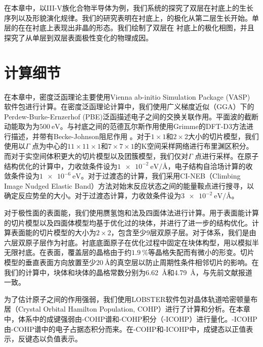 在本章中，以III-V族化合物半导体为例，我们系统的探究了双层在衬底上的生长序列以及形貌演化规律。我们的研究表明在衬底上，的极化从第二层生长开始。单层的在在衬底上表现出非晶的形态。我们绘制了双层在
衬底上的极化相图，并且探究了从单层到双层表面极性变化的物理成因。
\section{计算细节}
在本章中，密度泛函理论主要使用Vienna ab-initio Simulation Package (VASP) 软件包进行计算。在密度泛函理论计算中，我们使用广义梯度近似（GGA）下的Perdew-Burke-Ernzerhof (PBE)泛函描述电子之间的交换关联作用。平面波的截断动能取为为$\SI{500}{\electronvolt}$。与衬底之间的范德瓦尔斯作用使用Grimme的DFT-D3方法进行描述，并带有Becke-Johnson阻尼作用 。对于$1 \times 1$和$2 \times 2$大小的切片模型，我们使用以$\Gamma$ 点为中心的$11 \times 11 \times 1$和$7 \times 7 \times 1$的K空间采样网络进行布里渊区积分。而对于实空间体积更大的切片模型以及团簇模型，我们仅对$\Gamma$ 点进行采样。在原子结构优化的计算中，力收敛条件设为$\SI{1e-2}{\electronvolt \per \angstrom}$，电子结构自洽场计算的收敛条件设为$\SI{1e-6}{\electronvolt}$。对于过渡态的计算，我们采用CI-NEB（Climbing Image Nudged Elastic Band）方法对始末反应状态之间的能量鞍点进行搜寻，以确定反应势垒的大小。对于过渡态计算，力收敛条件设为$\SI{3e-2}{\electronvolt \per \angstrom}$。

对于极性面的表面能，我们使用赝氢饱和法及四面体法进行计算。用于表面能计算的切片模型以及四面体模型均基于优化过的块体，并进行了进一步的结构优化。计算表面能的切片模型的大小为$2 \times 2$，包含至少9层双原子层。对于体系，我们是由六层双原子层作为衬底。衬底底面原子在优化过程中固定在块体构型，用以模拟半无限衬底。在表面，覆盖层的晶格由于约$\SI{1.9}{\percent}$等晶格失配而有微小的形变。切片模型的垂直表面方向放置至少$\SI{20}{\angstrom}$的真空层以防止周期性条件相邻切片的影响。在我们的计算中，块体和块体的晶格常数分别为\SI{6.62}{\angstrom}和\SI{4.79}{\angstrom}，与先前文献报道一致。

为了估计原子之间的作用强弱，我们使用LOBSTER软件包对晶体轨道哈密顿量布居（Crystal Orbital Hamilton Population, COHP）进行了计算和分析。在本章中，体系中的成键强弱由-COHP谱和-COHP积分（-ICOHP）进行量化。-ICOHP由-COHP谱中的电子占据态积分而来。在-COHP和-ICOHP中，成键态以正值表示，反键态以负值表示。
